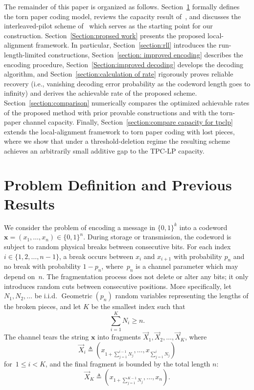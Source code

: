 \documentclass[journal,letterpaper,onecolumn,11pt]{IEEEtran}
\newcommand{\boldx}{\mathbf{x}}
\begin{document}
The remainder of this paper is organized as follows. Section~\ref{Section:problem definition} formally defines the torn paper coding model, reviews the capacity result of~\cite{shomorony2021torn}, and discusses the interleaved-pilot scheme of~\cite{shomorony2021torn} which serves as the starting point for our construction. 
Section~\ref{Section:propsed work} presents the proposed local-alignment framework. 
In particular, Section~\ref{section:rll} introduces the run-length-limited constructions, Section~\ref{section: improved encoding} describes the encoding procedure, Section~\ref{Section:improved decoding} develops the decoding algorithm, and Section~\ref{section:calculation of rate} rigorously proves reliable recovery (i.e., vanishing decoding error probability as the codeword length goes to infinity) and derives the achievable rate of the proposed scheme. Section~\ref{section:comparison} numerically compares the optimized achievable rates of the proposed method with prior provable constructions and with the torn-paper channel capacity. 
Finally, Section~\ref{section:compare capacity for tpclp} extends the local-alignment framework to torn paper coding with lost pieces, where we show that under a threshold-deletion regime the resulting scheme achieves an arbitrarily small additive gap to the TPC-LP capacity.
\section{Problem Definition and Previous Results}\label{Section:problem definition}
We consider the problem of encoding 
a message in $\{0,1\}^k$ into a codeword~$\boldx=(x_1,\ldots,x_n)\in\{0,1\}^n$. 
During storage or transmission, the codeword is subject to random physical breaks between consecutive bits. 
For each index $i\in \{1,2,\dots,n-1\}$, a break occurs between $x_i$ and $x_{i+1}$ with probability $p_n$ and no break with probability $1-p_n$, where~$p_n$ is a channel parameter which may depend on~$n$.
The fragmentation process does not delete or alter any bits; it only introduces random cuts between consecutive positions. 
More specifically, let $N_1, N_2, \ldots$ be i.i.d. $\operatorname{Geometric}(p_n)$ random variables representing the lengths of the broken pieces, and let $K$ be the smallest index such that $$\sum_{i=1}^{K} N_i \ge n.$$
The channel tears the string $\boldx$ into fragments $\vec{X}_1, \vec{X}_2, \ldots, \vec{X}_K$, where 
$$\vec{X}_i \triangleq \left( x_{1+\sum_{j=1}^{i-1} N_j}, \dots, x_{\sum_{j=1}^i N_j} \right)$$
for~$1\le i<K$, and the final fragment is bounded by the total length $n$:$$\vec{X}_K \triangleq \left( x_{1+\sum_{j=1}^{K-1} N_j}, \dots, x_n \right).$$
\end{document}
